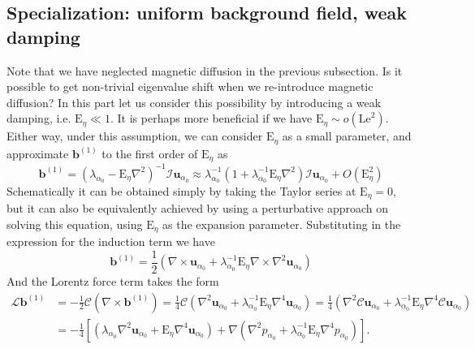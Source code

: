 \subsection{Specialization: uniform background field, weak damping}

Note that we have neglected magnetic diffusion in the previous subsection. Is it possible to get non-trivial eigenvalue shift when we re-introduce magnetic diffusion? In this part let us consider this possibility by introducing a weak damping, i.e. $\mathrm{E}_\eta \ll 1$. It is perhaps more beneficial if we have $\mathrm{E}_\eta \sim o\left(\mathrm{Le}^2\right)$. Either way, under this assumption, we can consider $\mathrm{E}_\eta$ as a small parameter, and approximate $\mathbf{b}^{(1)}$ to the first order of $\mathrm{E}_\eta$ as
%
\begin{equation}
    \mathbf{b}^{(1)} = \left(\lambda_{\alpha_0} - \mathrm{E}_\eta\nabla^2 \right)^{-1} \mathcal{I} \mathbf{u}_{\alpha_0} \approx \lambda_{\alpha_0}^{-1} \left(1 + \lambda_{\alpha_0}^{-1} \mathrm{E}_\eta \nabla^2\right) \mathcal{I} \mathbf{u}_{\alpha_0} + O(\mathrm{E}_\eta^2)
\end{equation}
%
Schematically it can be obtained simply by taking the Taylor series at $\mathrm{E}_\eta=0$, but it can also be equivalently achieved by using a perturbative approach on solving this equation, using $\mathrm{E}_\eta$ as the expansion parameter. Substituting in the expression for the induction term we have
%
\begin{equation}
    \mathbf{b}^{(1)} = \frac{1}{2} \left(\nabla\times \mathbf{u}_{\alpha_0} + \lambda_{\alpha_0}^{-1} \mathrm{E}_\eta \nabla\times \nabla^2 \mathbf{u}_{\alpha_0}\right)
\end{equation}
%
And the Lorentz force term takes the form
%
\begin{equation}
\begin{aligned}
    \mathcal{L} \mathbf{b}^{(1)} &= - \frac{1}{2} \mathcal{C} \left(\nabla\times \mathbf{b}^{(1)}\right) = \frac{1}{4} \mathcal{C} \left(\nabla^2 \mathbf{u}_{\alpha_0} + \lambda_{\alpha_0}^{-1} \mathrm{E}_\eta \nabla^4 \mathbf{u}_{\alpha_0}\right) = \frac{1}{4} \left(\nabla^2 \mathcal{C} \mathbf{u}_{\alpha_0} + \lambda_{\alpha_0}^{-1} \mathrm{E}_\eta \nabla^4 \mathcal{C} \mathbf{u}_{\alpha_0}\right) \\
    &= - \frac{1}{4} \left[ \left(\lambda_{\alpha_0} \nabla^2 \mathbf{u}_{\alpha_0} + \mathrm{E}_\eta \nabla^4 \mathbf{u}_{\alpha_0}\right) + \nabla \left(\nabla^2 p_{\alpha_0} + \lambda_{\alpha_0}^{-1} \mathrm{E}_\eta \nabla^4 p_{\alpha_0}\right) \right].
\end{aligned}
\end{equation}
